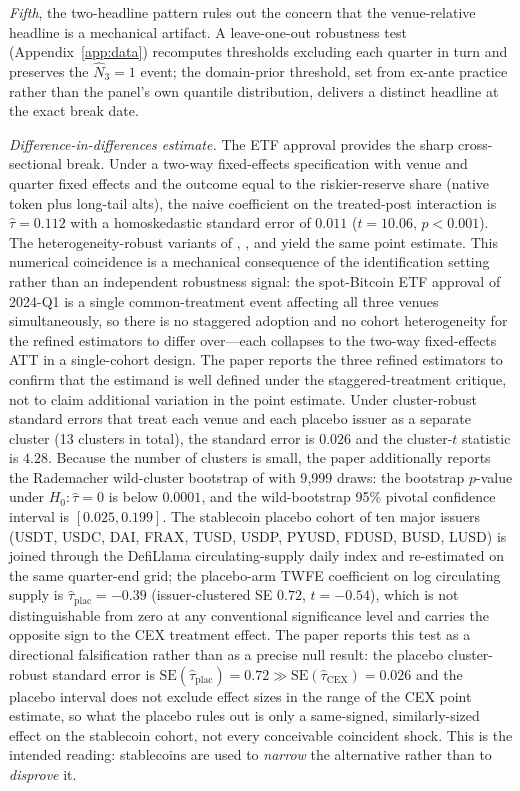 \documentclass[12pt]{article}
\theoremstyle{sampledef}
\theoremstyle{sampleplain}
\theoremstyle{sampleremark}
\newcommand{\1}{\mathbf{1}}
\begin{document}
\emph{Fifth}, the two-headline pattern rules out the concern that
the venue-relative headline is a mechanical artifact. A
leave-one-out robustness test (Appendix~\ref{app:data}) recomputes
thresholds excluding each quarter in turn and preserves the
$\hat N_3 = 1$ event; the domain-prior threshold, set from ex-ante
practice rather than the panel's own quantile distribution,
delivers a distinct headline at the exact break date.

\emph{Difference-in-differences estimate.} The ETF approval
provides the sharp cross-sectional break. Under a two-way
fixed-effects specification with venue and quarter fixed effects
and the outcome equal to the riskier-reserve share (native token
plus long-tail alts), the naive coefficient on the treated-post
interaction is $\hat\tau = 0.112$ with a homoskedastic standard
error of $0.011$ ($t = 10.06$, $p < 0.001$). The
heterogeneity-robust variants of \citet{Callaway-SantAnna2021},
\citet{Sun-Abraham2021}, and \citet{Borusyak2024} yield the same
point estimate. This numerical coincidence is a mechanical
consequence of the identification setting rather than an
independent robustness signal: the spot-Bitcoin ETF approval of
2024-Q1 is a single common-treatment event affecting all three
venues simultaneously, so there is no staggered adoption and no
cohort heterogeneity for the refined estimators to differ over---each
collapses to the two-way fixed-effects ATT in a single-cohort
design. The paper reports the three refined estimators to confirm
that the estimand is well defined under the staggered-treatment
critique, not to claim additional variation in the point estimate.
Under cluster-robust standard errors that treat
each venue and each placebo issuer as a separate cluster (13
clusters in total), the standard error is $0.026$ and the
cluster-$t$ statistic is $4.28$. Because the number of clusters is
small, the paper additionally reports the Rademacher wild-cluster
bootstrap of \citet{Cameron-Gelbach-Miller2008} with 9{,}999
draws: the bootstrap $p$-value under $H_0:\hat\tau = 0$ is below
$0.0001$, and the wild-bootstrap 95\% pivotal confidence interval
is $[0.025, 0.199]$. The stablecoin placebo cohort of ten major
issuers (USDT, USDC, DAI, FRAX, TUSD, USDP, PYUSD, FDUSD, BUSD,
LUSD) is joined through the DefiLlama circulating-supply daily
index and re-estimated on the same quarter-end grid; the
placebo-arm TWFE coefficient on log circulating supply is
$\hat\tau_{\text{plac}} = -0.39$ (issuer-clustered SE $0.72$,
$t = -0.54$), which is not distinguishable from zero at any
conventional significance level and carries the opposite sign to
the CEX treatment effect. The paper reports this test as a
directional falsification rather than as a precise null result:
the placebo cluster-robust standard error is
$\text{SE}(\hat\tau_{\text{plac}})=0.72 \gg
\text{SE}(\hat\tau_{\text{CEX}})=0.026$ and the placebo interval
does not exclude effect sizes in the range of the CEX
point estimate, so what the placebo rules out is only a
same-signed, similarly-sized effect on the stablecoin cohort, not
every conceivable coincident shock. This is the intended reading:
stablecoins are used to \emph{narrow} the alternative rather than
to \emph{disprove} it.
\end{document}

